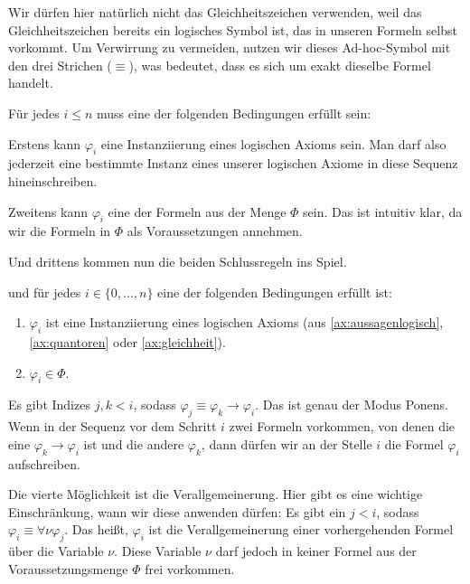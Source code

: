 \begin{spoken-clean}[00:19:30 - 00:21:14]
Wir dürfen hier natürlich nicht das Gleichheitszeichen verwenden, weil das Gleichheitszeichen bereits ein logisches Symbol ist, das in unseren Formeln selbst vorkommt. Um Verwirrung zu vermeiden, nutzen wir dieses Ad-hoc-Symbol mit den drei Strichen ($\equiv$), was bedeutet, dass es sich um exakt dieselbe Formel handelt. 

Für jedes $i \le n$ muss eine der folgenden Bedingungen erfüllt sein: 

Erstens kann $\varphi_i$ eine Instanziierung eines logischen Axioms sein. Man darf also jederzeit eine bestimmte Instanz eines unserer logischen Axiome in diese Sequenz hineinschreiben. 

Zweitens kann $\varphi_i$ eine der Formeln aus der Menge $\Phi$ sein. Das ist intuitiv klar, da wir die Formeln in $\Phi$ als Voraussetzungen annehmen. 

Und drittens kommen nun die beiden Schlussregeln ins Spiel.
\end{spoken-clean}

\begin{math-stroke}
und für jedes $i \in \{0, \dots, n\}$ eine der folgenden Bedingungen erfüllt ist:
\begin{enumerate}[label=\textbf{(\arabic*)}]
    \setcounter{enumi}{0} \item $\varphi_i$ ist eine Instanziierung eines logischen Axioms (aus \ref{ax:aussagenlogisch}, \ref{ax:quantoren} oder \ref{ax:gleichheit}).
    \item $\varphi_i \in \Phi$.
\end{enumerate}
\end{math-stroke}

\begin{spoken-clean}[00:21:14 - 00:22:22]
Es gibt Indizes $j, k < i$, sodass $\varphi_j \equiv \varphi_k \rightarrow \varphi_i$. Das ist genau der Modus Ponens. Wenn in der Sequenz vor dem Schritt $i$ zwei Formeln vorkommen, von denen die eine $\varphi_k \rightarrow \varphi_i$ ist und die andere $\varphi_k$, dann dürfen wir an der Stelle $i$ die Formel $\varphi_i$ aufschreiben. 

Die vierte Möglichkeit ist die Verallgemeinerung. Hier gibt es eine wichtige Einschränkung, wann wir diese anwenden dürfen: Es gibt ein $j < i$, sodass $\varphi_i \equiv \forall \nu \varphi_j$. Das heißt, $\varphi_i$ ist die Verallgemeinerung einer vorhergehenden Formel über die Variable $\nu$. Diese Variable $\nu$ darf jedoch in keiner Formel aus der Voraussetzungsmenge $\Phi$ frei vorkommen.
\end{spoken-clean}

